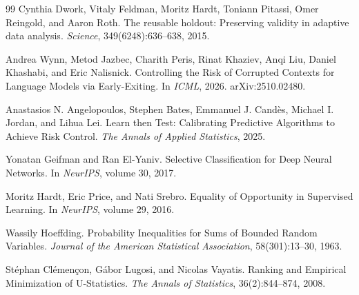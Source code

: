 \documentclass[10pt]{article}
\begin{document}
\begin{thebibliography}{99}
Cynthia Dwork, Vitaly Feldman, Moritz Hardt, Toniann Pitassi, Omer Reingold, and Aaron Roth.
\newblock The reusable holdout: Preserving validity in adaptive data analysis.
\newblock \emph{Science}, 349(6248):636--638, 2015.

Andrea Wynn, Metod Jazbec, Charith Peris, Rinat Khaziev, Anqi Liu, Daniel Khashabi, and Eric Nalisnick.
\newblock Controlling the Risk of Corrupted Contexts for Language Models via Early-Exiting.
\newblock In \emph{ICML}, 2026. arXiv:2510.02480.

Anastasios N. Angelopoulos, Stephen Bates, Emmanuel J. Cand\`es, Michael I. Jordan, and Lihua Lei.
\newblock Learn then Test: Calibrating Predictive Algorithms to Achieve Risk Control.
\newblock \emph{The Annals of Applied Statistics}, 2025.

Yonatan Geifman and Ran El-Yaniv.
\newblock Selective Classification for Deep Neural Networks.
\newblock In \emph{NeurIPS}, volume 30, 2017.

Moritz Hardt, Eric Price, and Nati Srebro.
\newblock Equality of Opportunity in Supervised Learning.
\newblock In \emph{NeurIPS}, volume 29, 2016.

Wassily Hoeffding.
\newblock Probability Inequalities for Sums of Bounded Random Variables.
\newblock \emph{Journal of the American Statistical Association}, 58(301):13--30, 1963.

St{\'e}phan Cl{\'e}men{\c c}on, G{\'a}bor Lugosi, and Nicolas Vayatis.
\newblock Ranking and Empirical Minimization of U-Statistics.
\newblock \emph{The Annals of Statistics}, 36(2):844--874, 2008.

\end{thebibliography}
\end{document}
